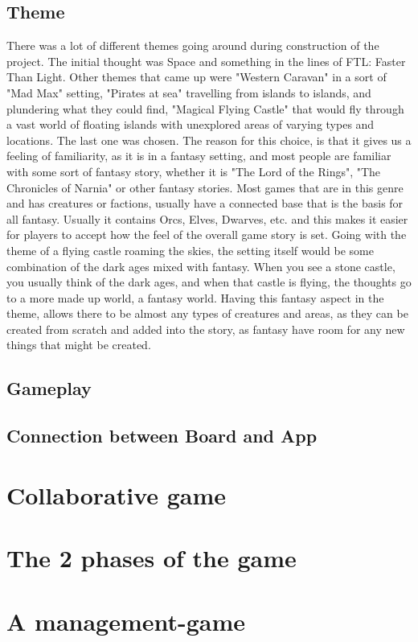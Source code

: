 \subsection{Theme}
There was a lot of different themes going around during construction of the project. The initial thought was Space and something in the lines of FTL: Faster Than Light. 
Other themes that came up were "Western Caravan" in a sort of "Mad Max" setting, "Pirates at sea" travelling from islands to islands, and plundering what they could find, "Magical Flying Castle" that would fly through a vast world of floating islands with unexplored areas of varying types and locations.
The last one was chosen. The reason for this choice, is that it gives us a feeling of familiarity, as it is in a fantasy setting, and most people are familiar with some sort of fantasy story, whether it is "The Lord of the Rings", "The Chronicles of Narnia" or other fantasy stories. Most games that are in this genre and has creatures or factions, usually have a connected base that is the basis for all fantasy. Usually it contains Orcs, Elves, Dwarves, etc. and this makes it easier for players to accept how the feel of the overall game story is set. 
Going with the theme of a flying castle roaming the skies, the setting itself would be some combination of the dark ages mixed with fantasy. When you see a stone castle, you usually think of the dark ages, and when that castle is flying, the thoughts go to a more made up world, a fantasy world. 
Having this fantasy aspect in the theme, allows there to be almost any types of creatures and areas, as they can be created from scratch and added into the story, as fantasy have room for any new things that might be created.

\subsection{Gameplay}
\subsection{Connection between Board and App}


\section{Collaborative game} 
\section{The 2 phases of the game}
\section{A management-game}
